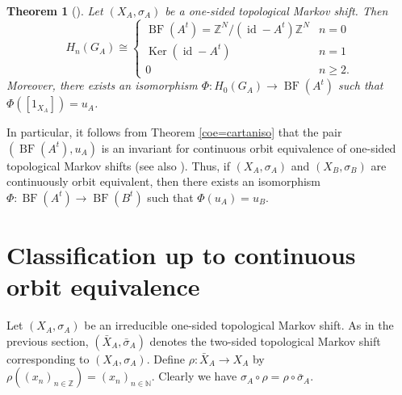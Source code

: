 \documentclass[11pt]{article}
\newtheorem{theorem}{Theorem}[section]
\theoremstyle{definition}
\numberwithin{equation}{section}
\newcommand{\BF}{\operatorname{BF}}
\newcommand{\id}{\operatorname{id}}
\newcommand{\Ker}{\operatorname{Ker}}
\newcommand{\N}{\mathbb{N}}
\newcommand{\Z}{\mathbb{Z}}
\begin{document}
\begin{theorem}[{\cite[Theorem 4.14]{Matui12PLMS}}]\label{HofGA}
Let $(X_A,\sigma_A)$ be a one-sided topological Markov shift. 
Then 
\[
H_n(G_A)\cong\begin{cases}\BF(A^t)=\Z^N/(\id-A^t)\Z^N&n=0\\
\Ker(\id-A^t)&n=1\\0&n\geq2. \end{cases}
\]
Moreover, there exists an isomorphism $\Phi:H_0(G_A)\to\BF(A^t)$ 
such that $\Phi([1_{X_A}])=u_A$. 
\end{theorem}

In particular, it follows from Theorem \ref{coe=cartaniso} that 
the pair $(\BF(A^t),u_A)$ is an invariant 
for continuous orbit equivalence of one-sided topological Markov shifts 
(see also \cite[Theorem 1.3]{Matsumoto13DCDS}). 
Thus, 
if $(X_A,\sigma_A)$ and $(X_B,\sigma_B)$ are continuously orbit equivalent, 
then there exists an isomorphism $\Phi:\BF(A^t)\to\BF(B^t)$ 
such that $\Phi(u_A)=u_B$. 




\section{Classification up to continuous orbit equivalence}




Let $(X_A,\sigma_A)$ be an irreducible one-sided topological Markov shift. 
As in the previous section, $(\bar X_A,\bar\sigma_A)$ denotes 
the two-sided topological Markov shift corresponding to $(X_A,\sigma_A)$. 
Define $\rho:\bar X_A\to X_A$ by $\rho((x_n)_{n\in\Z})=(x_n)_{n\in\N}$. 
Clearly we have $\sigma_A\circ\rho=\rho\circ\bar\sigma_A$. 
\end{document}
